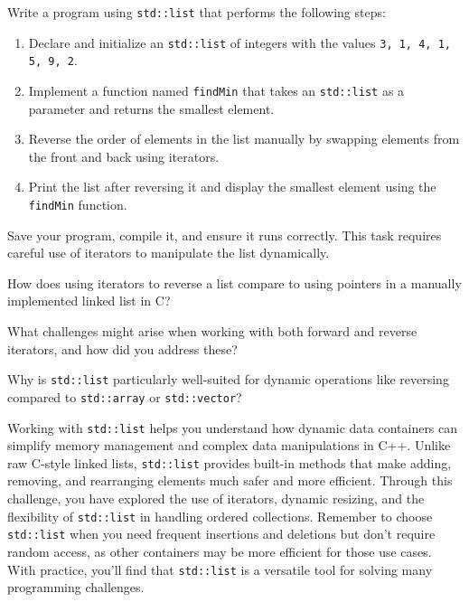 \begin{challenge}
    \begin{task}
        Write a program using \texttt{std::list} that performs the following steps:
        \begin{enumerate}
            \item Declare and initialize an \texttt{std::list} of integers with the values \texttt{3, 1, 4, 1, 5, 9, 2}.
            \item Implement a function named \texttt{findMin} that takes an \texttt{std::list} as a parameter and returns the smallest element.
            \item Reverse the order of elements in the list manually by swapping elements from the front and back using iterators.
            \item Print the list after reversing it and display the smallest element using the \texttt{findMin} function.
        \end{enumerate}

        Save your program, compile it, and ensure it runs correctly. This task requires careful use of iterators to manipulate the list dynamically.

        \begin{questions}
            \item How does using iterators to reverse a list compare to using pointers in a manually implemented linked list in C?
            \item What challenges might arise when working with both forward and reverse iterators, and how did you address these?
            \item Why is \texttt{std::list} particularly well-suited for dynamic operations like reversing compared to \texttt{std::array} or \texttt{std::vector}?
        \end{questions}
    \end{task}

    \begin{advice}
        Working with \texttt{std::list} helps you understand how dynamic data containers can simplify memory management and complex data manipulations in C++. 
        Unlike raw C-style linked lists, \texttt{std::list} provides built-in methods that make adding, removing, and rearranging elements much safer and more efficient. 
        Through this challenge, you have explored the use of iterators, dynamic resizing, and the flexibility of \texttt{std::list} in handling ordered collections. 
        Remember to choose \texttt{std::list} when you need frequent insertions and deletions but don't require random access, as other containers may be more efficient for those use cases. 
        With practice, you'll find that \texttt{std::list} is a versatile tool for solving many programming challenges.
    \end{advice}
\end{challenge}

